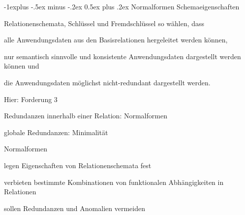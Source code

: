 \documentclass[a4paper]{article}
\makeatletter
\renewcommand{\subsection}{\@startsection{subsection}{2}{0mm}%
                                {-1explus -.5ex minus -.2ex}%
                                {0.5ex plus .2ex}%
                                {\normalfont\normalsize\bfseries}}
\makeatother
\begin{document}
\begin{multicols}{3}
\subsection{Normalformen}
Schemaeigenschaften
\begin{itemize*}
    \item Relationenschemata, Schlüssel und Fremdschlüssel so wählen, dass
    \begin{itemize*}
        \item alle Anwendungsdaten aus den Basisrelationen hergeleitet werden können,
        \item nur semantisch sinnvolle und konsistente Anwendungsdaten dargestellt werden können und
        \item die Anwendungsdaten möglichst nicht-redundant dargestellt werden.
    \end{itemize*}
    \item Hier: Forderung 3
    \begin{itemize*}
        \item Redundanzen innerhalb einer Relation: Normalformen
        \item globale Redundanzen: Minimalität
    \end{itemize*}
\end{itemize*}

Normalformen
\begin{itemize*}
    \item legen Eigenschaften von Relationenschemata fest
    \item verbieten bestimmte Kombinationen von funktionalen Abhängigkeiten in Relationen
    \item sollen Redundanzen und Anomalien vermeiden
\end{itemize*}


\end{multicols}
\end{document}
